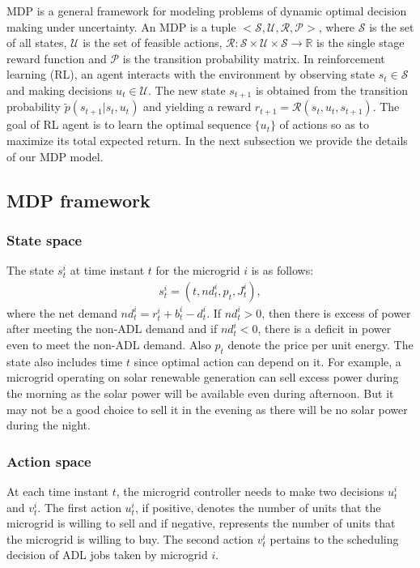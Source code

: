 MDP is a general framework for modeling problems of dynamic optimal decision making under uncertainty. An MDP is a tuple $<\mathcal{S},\mathcal{U},\mathcal{R},\mathcal{P}>$, where $\mathcal{S}$ is the set of all states, $\mathcal{U}$ is the set of  feasible actions, $\mathcal{R}:\mathcal{S}\times\mathcal{U}\times\mathcal{S}\to \mathbb{R} $ is the single stage reward function and $\mathcal{P}$ is the transition probability matrix. In reinforcement learning (RL), an agent interacts with the environment by observing state $s_t \in \mathcal{S}$ and  making decisions $u_t \in \mathcal{U}$. The new state $s_{t+1}$ is obtained from the transition probability $ \tilde p(s_{t+1} | s_t,u_t)$ and yielding a reward $r_{t+1} = \mathcal{R}(s_t,u_t,s_{t+1})$. The goal of  RL agent is to learn the optimal sequence $\{u_t\}$ of actions so as to maximize its total expected return.
 In the next subsection we provide the details of our MDP model.
\subsection{MDP framework}
\subsubsection{State space}
The state $s_{t}^{i}$ at time instant $t$  for the microgrid $i$ is as follows:
\begin{align}
s_{t}^{i} = (t,nd_{t}^{i},p_{t}, J_{t}^{i}),
\end{align}
where the net demand $nd_{t}^{i} = r_{t}^{i} + b_{t}^{i} - d_{t}^{i}$.
If $nd_{t}^{i} > 0$, then  there is excess of power after meeting the non-ADL demand and if $nd_{t}^{i} < 0$, there is a deficit in power even to meet the non-ADL demand. Also $p_{t}$ denote the price per unit energy. The state also includes time $t$ since optimal action can depend on it. For example, a microgrid operating on solar renewable generation can sell excess power during the morning as the solar power will be available even during afternoon. But it may not be a good choice to sell it in the evening as there will be no solar power during the night. 
\subsubsection{Action space}
At each time instant $t$, the microgrid controller needs to make two decisions $u_{t}^{i}$ and $v_{t}^{i}$. The first action $u_{t}^{i}$, if positive, denotes the number of units that the microgrid is willing to sell and if negative, represents the number of units that the microgrid is willing to buy. The second action $v_{t}^{i}$ pertains to the scheduling decision of ADL jobs taken by microgrid $i$.

